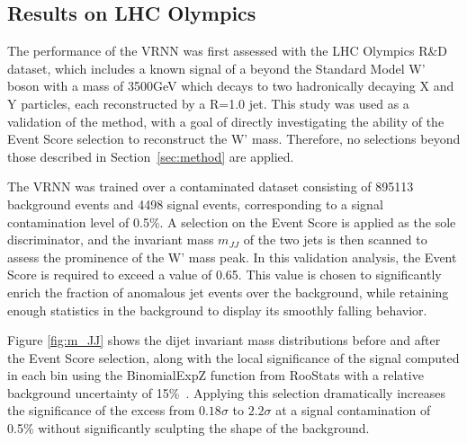 \documentclass[letterpaper,11pt]{article}
\begin{document}
\subsection{Results on LHC Olympics}
\label{sec:results}


The performance of the VRNN was first assessed with the LHC Olympics R\&D dataset, which includes a known signal of a beyond the Standard Model W' boson with a mass of 3500GeV which decays to two hadronically decaying X and Y particles, each reconstructed by a R=1.0 jet.
This study was used as a validation of the method, with a goal of directly investigating the ability of the Event Score selection to reconstruct the W' mass. 
Therefore, no selections beyond those described in Section~\ref{sec:method} are applied.


The VRNN was trained over a contaminated dataset consisting of 895113 background events and 4498 signal events, corresponding to a signal contamination level of 0.5\%.
A selection on the Event Score is applied as the sole discriminator, and the invariant mass $m_{JJ}$ of the two jets is then scanned to assess the prominence of the W' mass peak.
In this validation analysis, the Event Score is required to exceed a value of 0.65. 
This value is chosen to significantly enrich the fraction of anomalous jet events over the background, while retaining enough statistics in the background to display its smoothly falling behavior.

Figure \ref{fig:m_JJ} shows the dijet invariant mass distributions before and after the Event Score selection, along with the local significance of the signal computed in each bin using the {\sc BinomialExpZ} function from {\sc RooStats} with a relative background uncertainty of 15\%~\cite{moneta2011roostats}.
Applying this selection dramatically increases the significance of the excess from $0.18\sigma$ to $2.2\sigma$ at a signal contamination of 0.5\% without significantly sculpting the shape of the background.
\end{document}
